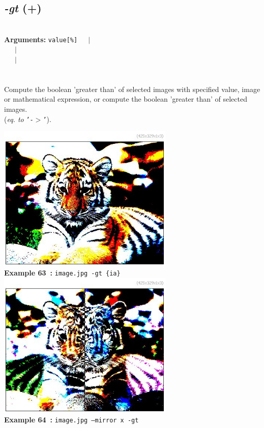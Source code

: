 \documentclass[a4paper,11pt,twoside]{book}
\begin{document}
\subsection{\emph{-gt} (+)}\vspace*{-0.5em}
~\\\textbf{Arguments: } 
{\small \texttt{value[\%]}}~~~$|$\\
\hspace*{2.2cm}{\small \texttt{[image]}}~~~$|$\\
~~~$|$\\
\\~\\
Compute the boolean 'greater than' of selected images with specified value, image or
mathematical expression, or compute the boolean 'greater than' of selected images.
~\\(\emph{eq. to} {\small \texttt{'-$>$'}}).
\begin{center}\includegraphics[keepaspectratio=true,height=7cm,width=\textwidth]{img/gmic_def63.jpg}\\
{\footnotesize \textbf{Example 63~:} \texttt{image.jpg -gt \{ia\}}}
\\\includegraphics[keepaspectratio=true,height=7cm,width=\textwidth]{img/gmic_def64.jpg}\\
{\footnotesize \textbf{Example 64~:} \texttt{image.jpg --mirror x -gt}}
\end{center}
\end{document}
